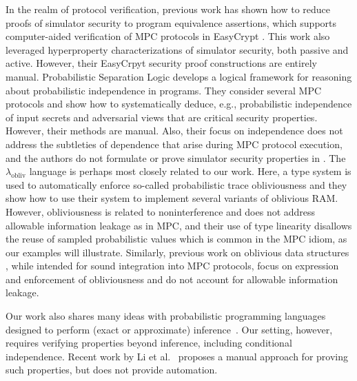 In the realm of protocol verification, previous work has shown how to
reduce proofs of simulator security to program equivalence assertions,
which supports computer-aided verification of MPC protocols in
EasyCrypt \cite{8429300}. This work also leveraged hyperproperty
characterizations of simulator security, both passive and
active. However, their EasyCrpyt security proof constructions are
entirely manual. Probabilistic Separation Logic
\cite{barthe2019probabilistic} develops a logical framework for
reasoning about probabilistic independence in programs.  They consider
several MPC protocols and show how to systematically deduce, e.g.,
probabilistic independence of input secrets and adversarial views that
are critical security properties.  However, their methods are manual. 
Also, their focus on independence does not address the subtleties of
dependence that arise during MPC protocol execution, and the authors
do not formulate or prove simulator security properties in
\cite{barthe2019probabilistic}. The $\lambda_{\mathrm{obliv}}$
language \cite{darais2019language} is perhaps most closely related to
our work. Here, a type system is used to automatically enforce
so-called probabilistic trace obliviousness and they show how to use
their system to implement several variants of oblivious RAM. However,
obliviousness is related to noninterference and does not address
allowable information leakage as in MPC, and their use of type
linearity disallows the reuse of sampled probabilistic values which is
common in the MPC idiom, as our examples will illustrate. Similarly,
previous work on oblivious data structures \cite{10.1145/3498713},
while intended for sound integration into MPC protocols, focus on
expression and enforcement of obliviousness and do not account for
allowable information leakage.

Our work also shares many ideas with probabilistic programming
languages designed to perform (exact or approximate)
inference~\cite{holtzen2020scaling, carpenter2017stan, wood2014new,
  bingham2019pyro, albarghouthi2017fairsquare, de2007problog,
  pfeffer2009figaro, saad2021sppl}. Our setting, however, requires
verifying properties beyond inference, including conditional
independence. Recent work by Li et al.~\cite{li2023lilac} proposes a
manual approach for proving such properties, but does not provide
automation.

